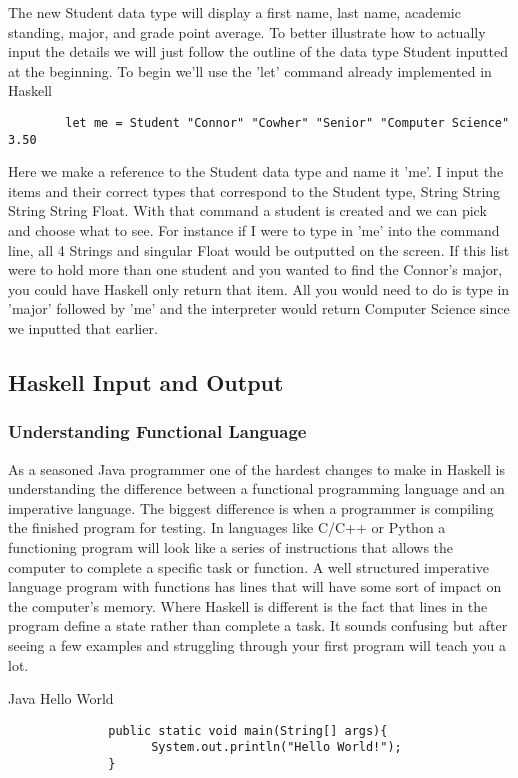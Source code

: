 \documentclass{article}
\begin{document}
    \noindent The new Student data type will display a first name, last name, academic standing, major, and grade point average. To better illustrate how to actually input the details we will just follow the outline of the data type Student inputted at the beginning. To begin we'll use the 'let' command already implemented in Haskell
    
    \begin{lstlisting}
        let me = Student "Connor" "Cowher" "Senior" "Computer Science" 3.50
    \end{lstlisting}
    \noindent Here we make a reference to the Student data type and name it 'me'. I input the items and their correct types that correspond to the Student type, String String String String Float. With that command a student is created and we can pick and choose what to see. For instance if I were to type in 'me' into the command line, all 4 Strings and singular Float would be outputted on the screen. If this list were to hold more than one student and you wanted to find the Connor's major, you could have Haskell only return that item. All you would need to do is type in 'major' followed by 'me' and the interpreter would return Computer Science since we inputted that earlier. 
    
\subsection{Haskell Input and Output}
    \subsubsection{Understanding Functional Language}
    As a seasoned Java programmer one of the hardest changes to make in Haskell is understanding the difference between a functional programming language and an imperative language. The biggest difference is when a programmer is compiling the finished program for testing. In languages like C/C++ or Python a functioning program will look like a series of instructions that allows the computer to complete a specific task or function. A well structured imperative language program with functions has lines that will have some sort of impact on the computer's memory. Where Haskell is different is the fact that lines in the program define a state rather than complete a task. It sounds confusing but after seeing a few examples and struggling through your first program will teach you a lot. 
    
    \medskip
    \caption{Java Hello World}
    \begin{lstlisting}
              public static void main(String[] args){
                    System.out.println("Hello World!");
              }
    \end{lstlisting}
    
\end{document}
